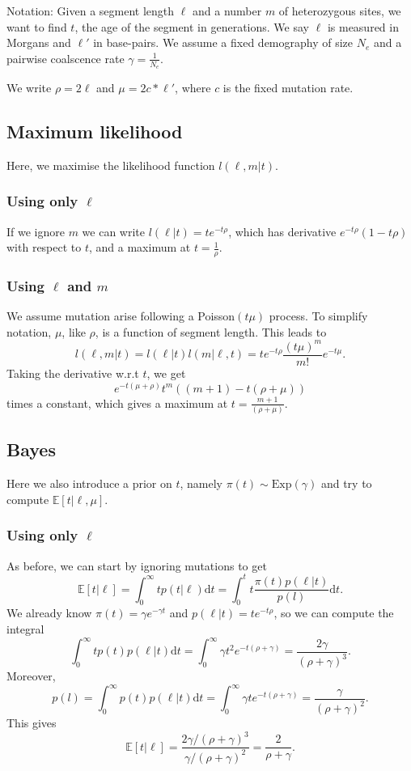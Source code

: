 \documentclass[a4paper]{article}
\newcommand{\E}{\mathbb{E}}
\renewcommand{\d}{\mathrm{d}}
\begin{document}
Notation: Given a segment length $\ell$ and a number $m$ of heterozygous sites, we want
to find $t$, the age of the segment in generations.
We say $\ell$ is measured in Morgans and $\ell'$ in base-pairs.
We assume a fixed demography of size $N_e$ and a pairwise coalscence rate $\gamma=\frac{1}{N_e}$.

We write $\rho = 2 \ell$ and $\mu = 2 c * \ell'$, where $c$ is the fixed mutation rate.

\subsection*{Maximum likelihood}

Here, we maximise the likelihood function $l(\ell, m|t)$.

\subsubsection*{Using only $\ell$}

If we ignore $m$ we can write $l(\ell | t) = t e^{-t\rho}$,
which has derivative $e^{-t\rho}(1 - t\rho)$ with respect to $t$, and
a maximum at $t=\frac{1}{\rho}$.

\subsubsection*{Using $\ell$ and $m$}

We assume mutation arise following a Poisson$(t\mu)$ process.
To simplify notation, $\mu$, like $\rho$, is a function of segment length.
This leads to
\[
  l(\ell, m|t) = l(\ell|t)l(m|\ell,t) = te^{-t\rho}\frac{(t\mu)^m}{m!}e^{-t\mu}.
\]
Taking the derivative w.r.t $t$, we get
\[
  e^{-t(\mu + \rho)}t^m((m+1) - t(\rho + \mu))
\]
times a constant, which gives a maximum at $t=\frac{m+1}{(\rho + \mu)}$.

\subsection*{Bayes}

Here we also introduce a prior on $t$, namely $\pi(t)\sim \mathrm{Exp}(\gamma)$
and try to compute $\E[t|\ell, \mu]$.

\subsubsection*{Using only $\ell$}

As before, we can start by ignoring mutations to get
\[
  \E[t|\ell] = \int_0^\infty t p(t|\ell)\d t = \int_0^t t \frac{\pi(t)p(\ell|t)}{p(l)}\d t.
\]
We already know $\pi(t) = \gamma e^{-\gamma t}$ and $p(\ell|t) = te^{-t\rho}$,
so we can compute the integral
\[
  \int_0^\infty t p(t)p(\ell | t)\d t = \int_0^\infty \gamma t^2 e^{-t(\rho+\gamma)} = 
  \frac{2\gamma}{(\rho + \gamma)^3}.
\]
Moreover,
\[
  p(l) = \int_0^\infty p(t)p(\ell | t)\d t = \int_0^\infty \gamma t e^{-t(\rho + \gamma)}
  = \frac{\gamma}{(\rho + \gamma)^2}.
\]
This gives
\[
  \E[t | \ell] = \frac{2\gamma / (\rho + \gamma)^3}{\gamma / (\rho + \gamma)^2} = \frac{2}{\rho + \gamma}.
\]
\end{document}
